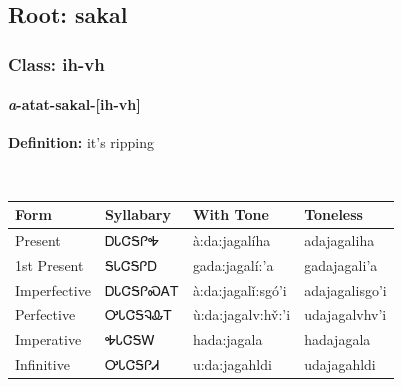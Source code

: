 \needspace{4in}
\subsection*{Root: sakal}
\nopagebreak
{}
\needspace{3in}
\subsubsection*{Class: ih-vh}
\nopagebreak
\needspace{2in}
\paragraph*{\textit{a}{-}atat{-}\textbf{sakal}{-}[ih-vh]}
\nopagebreak
\textbf{Definition: } it{\textquoteright}s ripping
\\[0.5em]
\begin{tabularx}{\textwidth}{l X X X}%
\toprule%
\textbf{Form}&\textbf{Syllabary}&\textbf{With Tone}&\textbf{Toneless}\\%
\midrule%
Present&ᎠᏓᏣᎦᎵᎭ&à:da:jagalíha&adajagaliha\\%
1st Present&ᎦᏓᏣᎦᎵᎠ&gada:jagalí:’a&gadajagali’a\\%
Imperfective&ᎠᏓᏣᎦᎵᏍᎪᎢ&à:da:jagalǐ:sgó’i&adajagalisgo’i\\%
Perfective&ᎤᏓᏣᎦᎸᎲᎢ&ù:da:jagalv:hv̌:’i&udajagalvhv’i\\%
Imperative&ᎭᏓᏣᎦᎳ&hada:jagala&hadajagala\\%
Infinitive&ᎤᏓᏣᎦᎵᏗ&u:da:jagahldi&udajagahldi\\%
\bottomrule%
\end{tabularx}
\\[1em]